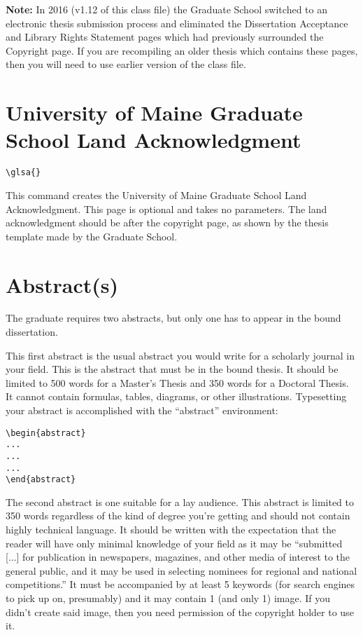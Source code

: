 \textbf{Note:} In 2016 (v1.12 of this class file) the Graduate School switched to an electronic thesis submission process and eliminated the Dissertation Acceptance and Library Rights Statement pages which had previously surrounded the Copyright page.  If you are recompiling an older thesis which contains these pages, then you will need to use earlier version of the class file.
\section{University of Maine Graduate School Land Acknowledgment}\label{glsa}
\begin{verbatim}
\glsa{}
\end{verbatim}

This command creates the University of Maine Graduate School Land Acknowledgment. This page is optional and takes no parameters. The land acknowledgment should be after the copyright page, as shown by the thesis template made by the Graduate School. 
\section{Abstract(s)}\label{abstracts}
The graduate requires two abstracts, but only one has to appear in the bound dissertation.

This first abstract is the usual abstract you would write for a scholarly journal in your field.  This is the abstract that must be in the bound thesis.  It should be limited to 500 words for a Master's Thesis and 350 words for a Doctoral Thesis.  It cannot contain formulas, tables, diagrams, or other illustrations.  Typesetting your abstract is accomplished with the ``abstract'' environment:
\begin{verbatim}
\begin{abstract}
...
...
...
\end{abstract}
\end{verbatim}

The second abstract is one suitable for a lay audience.  This abstract is limited to 350 words regardless of the kind of degree you're getting and should not contain highly technical language.  It should be written with the expectation that the reader will have only minimal knowledge of your field as it may be ``submitted [...] for publication in newspapers, magazines, and other media of
interest to the general public, and it may be used in selecting nominees for regional and
national competitions.''  It must be accompanied by at least 5 keywords (for search engines to pick up on, presumably) and it may contain 1 (and only 1) image.  If you didn't create said image, then you need permission of the copyright holder to use it.


